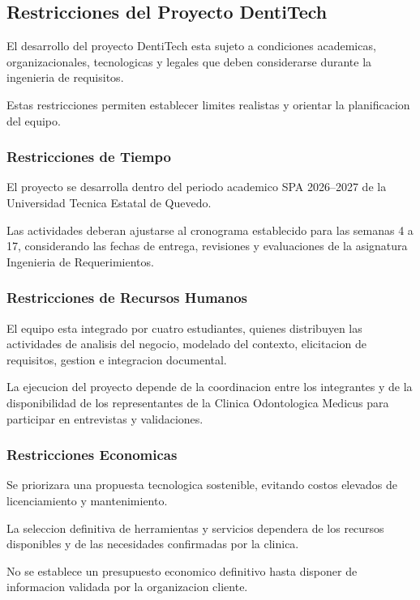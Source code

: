 \subsection{Restricciones del Proyecto DentiTech}

El desarrollo del proyecto DentiTech esta sujeto
a condiciones academicas, organizacionales,
tecnologicas y legales que deben considerarse
durante la ingenieria de requisitos.

Estas restricciones permiten establecer limites
realistas y orientar la planificacion del equipo.

\subsubsection{Restricciones de Tiempo}

El proyecto se desarrolla dentro del periodo
academico SPA 2026--2027 de la Universidad
Tecnica Estatal de Quevedo.

Las actividades deberan ajustarse al cronograma
establecido para las semanas 4 a 17, considerando
las fechas de entrega, revisiones y evaluaciones
de la asignatura Ingenieria de Requerimientos.

\subsubsection{Restricciones de Recursos Humanos}

El equipo esta integrado por cuatro estudiantes,
quienes distribuyen las actividades de analisis
del negocio, modelado del contexto, elicitacion
de requisitos, gestion e integracion documental.

La ejecucion del proyecto depende de la
coordinacion entre los integrantes y de la
disponibilidad de los representantes de la
Clinica Odontologica Medicus para participar
en entrevistas y validaciones.

\subsubsection{Restricciones Economicas}

Se priorizara una propuesta tecnologica
sostenible, evitando costos elevados de
licenciamiento y mantenimiento.

La seleccion definitiva de herramientas y
servicios dependera de los recursos disponibles
y de las necesidades confirmadas por la clinica.

No se establece un presupuesto economico
definitivo hasta disponer de informacion
validada por la organizacion cliente.

